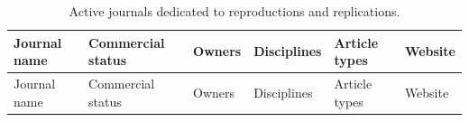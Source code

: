 \documentclass[
  letterpaper,
  DIV=11,
  openany,
  fontsize=12pt,
  parskip=half,
  headings=big,
  numbers=noenddot,
  titlepage=false]{scrreprt}
\begin{document}
\begin{longtable}[]{@{}
  >{\raggedright\arraybackslash}p{}
  >{\raggedright\arraybackslash}p{}
  >{\raggedright\arraybackslash}p{}
  >{\raggedright\arraybackslash}p{}
  >{\raggedright\arraybackslash}p{}
  >{\raggedright\arraybackslash}p{}@{}}
\caption{Active journals dedicated to reproductions and
replications.}\label{tbl-rep-journals}\tabularnewline
\toprule\noalign{}
\begin{minipage}[b]{\linewidth}\raggedright
Journal name
\end{minipage} & \begin{minipage}[b]{\linewidth}\raggedright
Commercial status
\end{minipage} & \begin{minipage}[b]{\linewidth}\raggedright
Owners
\end{minipage} & \begin{minipage}[b]{\linewidth}\raggedright
Disciplines
\end{minipage} & \begin{minipage}[b]{\linewidth}\raggedright
Article types
\end{minipage} & \begin{minipage}[b]{\linewidth}\raggedright
Website
\end{minipage} \\
\midrule\noalign{}
\endfirsthead
\toprule\noalign{}
\begin{minipage}[b]{\linewidth}\raggedright
Journal name
\end{minipage} & \begin{minipage}[b]{\linewidth}\raggedright
Commercial status
\end{minipage} & \begin{minipage}[b]{\linewidth}\raggedright
Owners
\end{minipage} & \begin{minipage}[b]{\linewidth}\raggedright
Disciplines
\end{minipage} & \begin{minipage}[b]{\linewidth}\raggedright
Article types
\end{minipage} & \begin{minipage}[b]{\linewidth}\raggedright
Website
\end{minipage} \\

\end{longtable}
\end{document}
